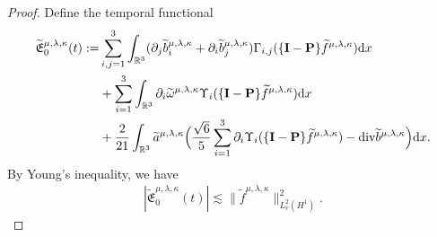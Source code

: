 \documentclass[reqno,11pt]{amsart}
\theoremstyle{plain}
\numberwithin{equation}{section}
\begin{document}
\begin{proof}
Define the temporal functional
\begin{align}\nonumber%
\widetilde{\mathfrak{E}}^{\mu,\lambda,\kappa}_0(t):= &   \sum_{i, j=1}^3 \int_{\mathbb{R}^3} 
 (\partial_j \widetilde{b}^{\mu,\lambda,\kappa}_i+\partial_i \widetilde{b}^{\mu,\lambda,\kappa}_j)  
 \Gamma_{i, j}(\{\mathbf{I}-\mathbf{P}\} \widetilde{f}^{\mu,\lambda,\kappa}) \mathrm{d} x \nonumber\\
&+  \sum_{i=1}^3 \int_{\mathbb{R}^3}   \partial_i \widetilde\omega^{\mu,\lambda,\kappa}  
 \Upsilon_i(\{\mathbf{I}-\mathbf{P}\} \widetilde{f}^{\mu,\lambda,\kappa}) \mathrm{d} x \nonumber\\
& +\frac{2}{21}  \int_{\mathbb{R}^3}   \widetilde{a}^{\mu,\lambda,\kappa}   
\Big(\frac{\sqrt{6}}{5} \sum_{i=1}^3 \partial_i \Upsilon_i(\{\mathbf{I}-\mathbf{P}\} 
\widetilde{f}^{\mu,\lambda,\kappa})-{\rm div}   \widetilde{b}^{\mu,\lambda,\kappa}\Big) \mathrm{d} x.
\end{align} 
By Young's inequality, we have
\begin{align}\label{G4.27}
|\widetilde{\mathfrak{E}}^{\mu,\lambda,\kappa}_0(t)|\lesssim  
\|\widetilde{f}^{\mu,\lambda,\kappa}\|_{L_v^2(H^1)}^2.    
\end{align}


\end{proof}
\end{document}
